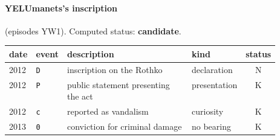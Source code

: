 \paragraph{YEL\enspace Umanets's inscription} (episodes YW1). Computed status: \textbf{candidate}.
\begin{center}\footnotesize\begin{tabular}{@{}llp{0.52\linewidth}lc@{}}
date & event & description & kind & status \\ \midrule
2012 & \texttt{D} & inscription on the Rothko & declaration & N \\
2012 & \texttt{P} & public statement presenting the act & presentation & K \\
2012 & \texttt{c} & reported as vandalism & curiosity & K \\
2013 & \texttt{0} & conviction for criminal damage & no bearing & K \\
\end{tabular}\end{center}
